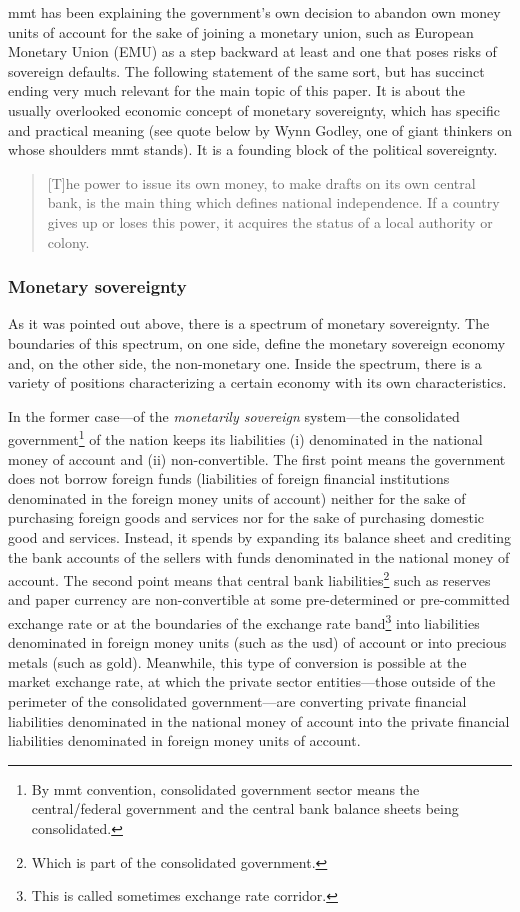 \ac{mmt} has been explaining the government's own decision to abandon own
money units of account for the sake of joining a monetary union, such as
European Monetary Union (EMU) as a step backward at least and one that
poses risks of sovereign defaults. The following statement of the same
sort, but has succinct ending very much relevant for the main topic of
this paper. It is about the usually overlooked economic concept of
monetary sovereignty, which has specific and practical meaning (see
quote below by Wynn Godley, one of giant thinkers on whose shoulders \ac{mmt}
stands). It is a founding block of the political sovereignty.

\begin{quote}
[T]he power to issue its own money, to make drafts on its own central bank, is the main thing which defines national independence. If a country gives up or loses this power, it acquires the status of a local authority or colony.~\citep[p.~6]{wray_2020}
\end{quote}


\subsubsection{Monetary sovereignty}

As it was pointed out above, there is a spectrum of monetary
sovereignty. The boundaries of this spectrum, on one side, define the
monetary sovereign economy and, on the other side, the non-monetary one.
Inside the spectrum, there is a variety of positions characterizing a
certain economy with its own characteristics.

In the former case---of the \textit{monetarily sovereign} system---the
consolidated government\footnote{By \ac{mmt} convention, consolidated government sector means the central/federal government and the central bank balance sheets being consolidated.} of the nation keeps its liabilities (i)
denominated in the national money of account and (ii)
non-convertible. The first point means the government does not borrow
foreign funds (liabilities of foreign financial institutions denominated
in the foreign money units of account) neither for the sake of
purchasing foreign goods and services nor for the sake of purchasing
domestic good and services. Instead, it spends by expanding its balance
sheet and crediting the bank accounts of the sellers with funds
denominated in the national money of account. The second point
means that central bank liabilities\footnote{Which is part of the consolidated government.} such as reserves and paper
currency are non-convertible at some pre-determined or pre-committed
exchange rate or at the boundaries of the exchange rate band\footnote{This is called sometimes exchange rate corridor.} into liabilities denominated in foreign money units (such as the \acf{usd}) of account or into precious metals (such as gold). Meanwhile, this type
of conversion is possible at the market exchange rate, at which the
private sector entities---those outside of the perimeter of the
consolidated government---are converting private financial liabilities
denominated in the national money of account into the private
financial liabilities denominated in foreign money units of account.


